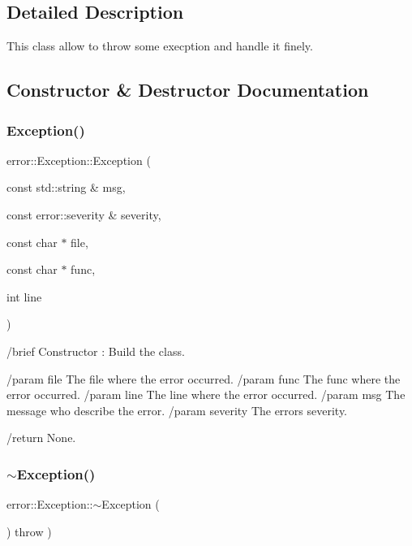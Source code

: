 \subsection{Detailed Description}
This class allow to throw some execption and handle it finely. 

\subsection{Constructor \& Destructor Documentation}
\mbox{\label{classerror_1_1Exception_ae9193ed1c5b211c31c239c5f30caefb4}} 
\subsubsection{\texorpdfstring{Exception()}{Exception()}}
{\footnotesize\ttfamily error\+::\+Exception\+::\+Exception (\begin{DoxyParamCaption}\item[{const std\+::string \&}]{msg,  }\item[{const error\+::severity \&}]{severity,  }\item[{const char $\ast$}]{file,  }\item[{const char $\ast$}]{func,  }\item[{int}]{line }\end{DoxyParamCaption})}



/brief Constructor \+: Build the class. 

/param file The file where the error occurred. /param func The func where the error occurred. /param line The line where the error occurred. /param msg The message who describe the error. /param severity The error\textquotesingle{}s severity.

/return None. \mbox{\label{classerror_1_1Exception_a1350d8f9d039facfd991b6782387eae5}} 
\subsubsection{\texorpdfstring{$\sim$\+Exception()}{~Exception()}}
{\footnotesize\ttfamily error\+::\+Exception\+::$\sim$\+Exception (\begin{DoxyParamCaption}{ }\end{DoxyParamCaption}) throw  ) \hspace{0.3cm}{\ttfamily [inline]}}



